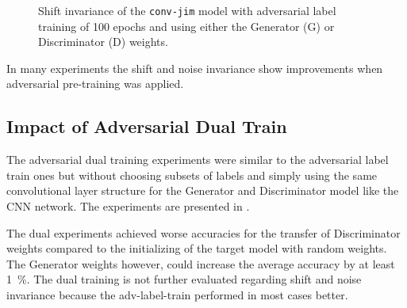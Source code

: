 \FloatBarrier
\noindent
\begin{figure}[!ht]
  \centering
  \caption{Shift invariance of the \texttt{conv-jim} model with adversarial label training of 100 epochs and using either the Generator (G) or Discriminator (D) weights.}
  \label{fig:exp_adv_label_tb_shift_conv-jim}
\end{figure}
\FloatBarrier
\noindent
In many experiments the shift and noise invariance show improvements when adversarial pre-training was applied. 



\subsection{Impact of Adversarial Dual Train}
The adversarial dual training experiments were similar to the adversarial label train ones but without choosing subsets of labels and simply using the same convolutional layer structure for the Generator and Discriminator model like the CNN network.
The experiments are presented in .

The dual experiments achieved worse accuracies for the transfer of Discriminator weights compared to the initializing of the target model with random weights.
The Generator weights however, could increase the average accuracy by at least \SI{1}{\percent}.
The dual training is not further evaluated regarding shift and noise invariance because the adv-label-train performed in most cases better.